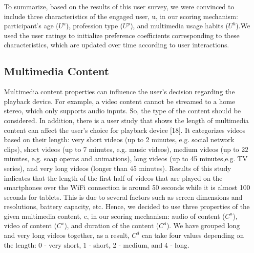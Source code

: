 \documentclass{article}
\begin{document}
To summarize, based on the results of this user survey, we were convinced to include three characteristics of the engaged user, u, in our scoring mechanism: participant's age ($U^a$), profession type ($U^p$), and multimedia usage habits ($U^h$).We used the user ratings to initialize preference coefficients corresponding to these characteristics, which are updated over time according to user interactions.
\subsection{Multimedia Content}
Multimedia content properties can influence the user's decision regarding the playback device. For example, a video content cannot be streamed to a home stereo, which only supports audio inputs. So, the type of the content should be considered. In addition, there is a user study that shows the length of multimedia content can affect the user's choice for playback device [18]. It categorizes videos based on their length: very short videos (up to 2 minutes, e.g. social network clips), short videos (up to 7 minutes, e.g. music videos), medium videos (up to 22 minutes, e.g. soap operas and animations), long videos (up to 45 minutes,e.g. TV series), and very long videos (longer than 45 minutes). Results of this study indicates that the length of the first half of videos that are played on the smartphones over the WiFi connection is around 50 seconds while it is almost 100 seconds for tablets. This is due to several factors such as screen dimensions and resolutions, battery capacity, etc. Hence, we decided to use three properties of the given multimedia content, c, in our scoring mechanism: audio of content ($C^a$), video of content ($C^v$), and duration of the content ($C^d$). We have grouped long and very long videos together, as a result, $C^d$ can take four values depending
on the length: 0 - very short, 1 - short, 2 - medium, and 4 - long.
\end{document}
